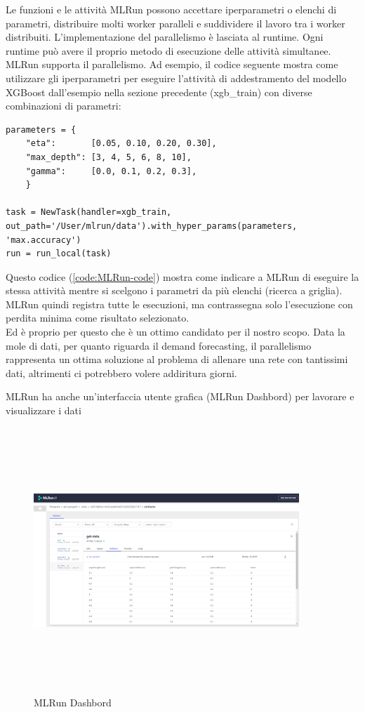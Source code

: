 \documentclass[12pt,a4paper]{report}
\begin{document}
Le funzioni e le attività MLRun possono accettare iperparametri o elenchi di parametri, distribuire molti worker paralleli e suddividere il lavoro tra i worker distribuiti. L'implementazione del parallelismo è lasciata al runtime. Ogni runtime può avere il proprio metodo di esecuzione delle attività simultanee.\\
MLRun supporta il parallelismo. Ad esempio, il codice seguente mostra come utilizzare gli iperparametri per eseguire l'attività di addestramento del modello XGBoost dall'esempio nella sezione precedente (xgb\_train) con diverse combinazioni di parametri:
\\
\begin{lstlisting}[caption={Esempio di codice},captionpos=b, label={code:MLRun-code}]
parameters = {
    "eta":       [0.05, 0.10, 0.20, 0.30],
    "max_depth": [3, 4, 5, 6, 8, 10],
    "gamma":     [0.0, 0.1, 0.2, 0.3],
    }

task = NewTask(handler=xgb_train, out_path='/User/mlrun/data').with_hyper_params(parameters, 'max.accuracy')
run = run_local(task)
\end{lstlisting}

Questo codice (\ref{code:MLRun-code}) mostra come indicare a MLRun di eseguire la stessa attività mentre si scelgono i parametri da più elenchi (ricerca a griglia). MLRun quindi registra tutte le esecuzioni, ma contrassegna solo l'esecuzione con perdita minima come risultato selezionato.\\
Ed è proprio per questo che è un ottimo candidato per il nostro scopo. Data la mole di dati, per quanto riguarda il demand forecasting, il parallelismo rappresenta un ottima soluzione al problema di allenare una rete con tantissimi dati, altrimenti ci potrebbero volere addiritura giorni.
\newpage

MLRun ha anche un'interfaccia utente grafica (MLRun Dashbord) per lavorare e visualizzare i dati
\begin{figure}[h!]
    \begin{center}
        \includegraphics[width=10cm,height=10cm,keepaspectratio]{MLRun Dashbord}
    \end{center}
    \caption{MLRun Dashbord}
    \label{fig:MLRun}
\end{figure}
\end{document}
